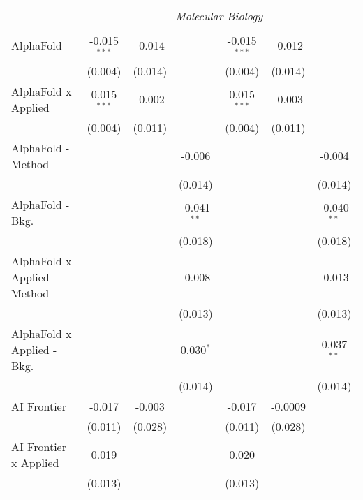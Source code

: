 \begin{tabular}{lcccccc}
 & \multicolumn{6}{c}{\textit{Molecular Biology}} \\ \\
   AlphaFold                    & -0.015$^{***}$ & -0.014  &               & -0.015$^{***}$ & -0.012  &   \\   
                                & (0.004)        & (0.014) &               & (0.004)        & (0.014) &   \\   
   AlphaFold x Applied          & 0.015$^{***}$  & -0.002  &               & 0.015$^{***}$  & -0.003  &   \\   
                                & (0.004)        & (0.011) &               & (0.004)        & (0.011) &   \\   
   AlphaFold - Method           &                &         & -0.006        &                &         & -0.004\\   
                                &                &         & (0.014)       &                &         & (0.014)\\   
   AlphaFold - Bkg.             &                &         & -0.041$^{**}$ &                &         & -0.040$^{**}$\\   
                                &                &         & (0.018)       &                &         & (0.018)\\   
   AlphaFold x Applied - Method &                &         & -0.008        &                &         & -0.013\\   
                                &                &         & (0.013)       &                &         & (0.013)\\   
   AlphaFold x Applied - Bkg.   &                &         & 0.030$^{*}$   &                &         & 0.037$^{**}$\\   
                                &                &         & (0.014)       &                &         & (0.014)\\   
   AI Frontier                  & -0.017         & -0.003  &               & -0.017         & -0.0009 &   \\   
                                & (0.011)        & (0.028) &               & (0.011)        & (0.028) &   \\   
   AI Frontier x Applied        & 0.019          &         &               & 0.020          &         &   \\   
                                & (0.013)        &         &               & (0.013)        &         &   \\   

\end{tabular}
